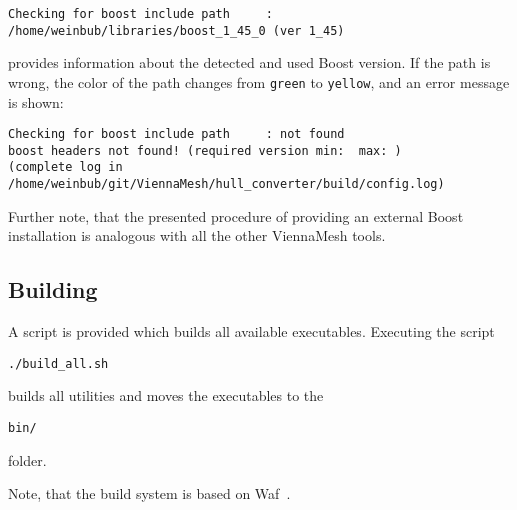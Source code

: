 \begin{exaipd}
\begin{Verbatim}
Checking for boost include path     : /home/weinbub/libraries/boost_1_45_0 (ver 1_45)
\end{Verbatim}
\end{exaipd}

provides information about the detected and used Boost version. If the path 
is wrong, the color of the path changes from \texttt{green} to \texttt{yellow}, 
and an error message is shown:

\begin{exaipd}
\begin{Verbatim}
Checking for boost include path     : not found 
boost headers not found! (required version min:  max: )
(complete log in /home/weinbub/git/ViennaMesh/hull_converter/build/config.log)
\end{Verbatim}
\end{exaipd}

Further note, that the presented procedure of providing an external Boost 
installation is analogous with all the other ViennaMesh tools.

\subsection{Building}
A script is provided which builds all available executables.
Executing the script 

\begin{exaipd}
\begin{Verbatim}
./build_all.sh
\end{Verbatim}
\end{exaipd}

builds all utilities and moves the executables to the 

\begin{exaipd}
\begin{Verbatim}
bin/
\end{Verbatim}
\end{exaipd}

folder.

Note, that the build system is based on Waf~\cite{waf}.

